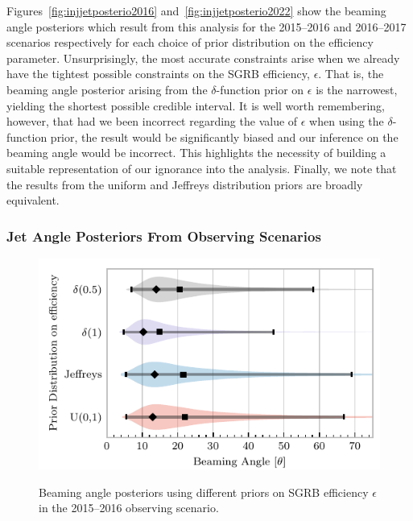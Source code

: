 \documentclass[twocolumn,nofootinbib]{revtex4-1}
\newcommand{\dwnote}[1]{{\color{dwnote}{[\textbf{DW}: #1]}}}
\renewcommand{\dwnote}{}
\begin{document}
%
Figures~\ref{fig:injjetposterio2016} and~\ref{fig:injjetposterio2022}
show the beaming angle posteriors which result from this analysis for
the 2015--2016 and 2016--2017 scenarios respectively for each choice
of prior distribution on the efficiency parameter.  Unsurprisingly,
the most accurate constraints arise when we already have the tightest
possible constraints on the \ac{SGRB} efficiency, $\epsilon$.  That
is, the beaming angle posterior arising from the $\delta$-function
prior on $\epsilon$ is the narrowest, yielding the shortest possible
credible interval.  It is well worth remembering, however, that had
we been incorrect regarding the value of $\epsilon$ when using the
$\delta$-function prior, the result would be significantly biased and
our inference on the beaming angle would be incorrect.  This
highlights the necessity of building a suitable representation of our
ignorance into the analysis.  Finally, we note that the results from
the uniform and Jeffreys distribution priors are broadly equivalent.


\subsubsection{Jet Angle Posteriors From Observing Scenarios}

\begin{figure}
\centering
{\includegraphics[width=\linewidth]{O1_beaming_posteriors_violin.pdf}}
\caption{Beaming angle posteriors using different priors on \ac{SGRB} efficiency $\epsilon$ in the 2015--2016 observing scenario.
    \label{fig:jetposterior2016}}
\end{figure}
\end{document}
